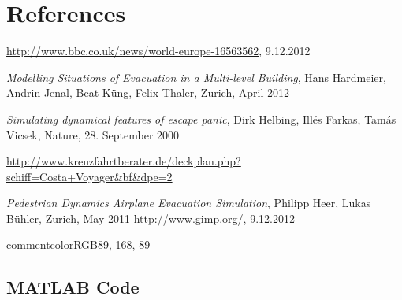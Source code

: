 \documentclass[11pt]{article}
\begin{document}
\newpage
\section{References}



\begingroup 
\renewcommand{\section}[2]{}%
\begin{thebibliography}{9}

		\url{http://www.bbc.co.uk/news/world-europe-16563562}, 9.12.2012

	\emph{Modelling Situations of Evacuation
in a Multi-level Building}, 
Hans Hardmeier, Andrin Jenal, Beat K\"ung, Felix Thaler, Zurich, April 2012

		\emph{Simulating dynamical features of escape panic},
		Dirk Helbing, Ill\'es Farkas, Tam\'as Vicsek, Nature, 28. September 2000

		\url{http://www.kreuzfahrtberater.de/deckplan.php?schiff=Costa+Voyager&bf&dpe=2}

		\emph{Pedestrian Dynamics Airplane Evacuation Simulation},
		Philipp Heer, Lukas Bühler, Zurich, May 2011
		\url{http://www.gimp.org/}, 9.12.2012
\end{thebibliography}
\endgroup

\newpage
\section{Appendix}

\definecolor{commentcolor}{RGB}{89, 168, 89}

\subsection{MATLAB Code}
\end{document}
